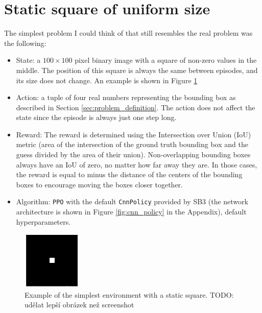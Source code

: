 \documentclass[
  digital,     %
  oneside,     %
  nosansbold,  %
  nocolorbold, %
  lof,         %
  lot,         %
]{fithesis4}
\begin{document}
\section{Static square of uniform size}
The simplest problem I could think of that still resembles the real problem was the following:
\begin{itemize}
    \item State: a $100\times100$ pixel binary image with a square of non-zero values in the middle. The position of this square is always the same between episodes, and its size does not change. An example is shown in Figure \ref{fig:env0}
    \item Action: a tuple of four real numbers representing the bounding box as described in Section \ref{sec:problem_definition}. The action does not affect the state since the episode is always just one step long.
    \item Reward: The reward is determined using the Intersection over Union (IoU) metric (area of the intersection of the ground truth bounding box and the guess divided by the area of their union). Non-overlapping bounding boxes always have an IoU of zero, no matter how far away they are. In those cases, the reward is equal to minus the distance of the centers of the bounding boxes to encourage moving the boxes closer together.
    \item Algorithm: \texttt{PPO} with the default \texttt{CnnPolicy} provided by SB3 (the network architecture is shown in Figure \ref{fig:cnn_policy} in the Appendix), default hyperparameters.
\end{itemize}

\begin{figure}
    \includegraphics[width=0.5\linewidth]{env_examples/env0.png}
    \caption{Example of the simplest environment with a static square. TODO: udělat lepší obrázek než screenshot}
    \label{fig:env0}
\end{figure}
\end{document}
